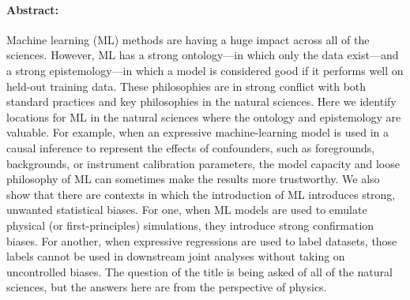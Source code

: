 \documentclass[10pt]{article}
\renewenvironment{abstract}{\paragraph{Abstract:}}{}
\begin{document}

\begin{abstract}
  Machine learning (ML) methods are having a huge impact across all of the sciences.
  However, ML has a strong ontology---in which only the data exist---and a strong epistemology---in which a model is considered good if it performs well on held-out training data.
  These philosophies are in strong conflict with both standard practices and key philosophies in the natural sciences.
  Here we identify locations for ML in the natural sciences where the ontology and epistemology are valuable.
  For example, when an expressive machine-learning model is used in a causal inference to represent the effects of confounders, such as foregrounds, backgrounds, or instrument calibration parameters, the model capacity and loose philosophy of ML can sometimes make the results more trustworthy.
  We also show that there are contexts in which the introduction of ML introduces strong, unwanted statistical biases.
  For one, when ML models are used to emulate physical (or first-principles) simulations, they introduce strong confirmation biases.
  For another, when expressive regressions are used to label datasets, those labels cannot be used in downstream joint analyses without taking on uncontrolled biases.
  The question of the title is being asked of all of the natural sciences, but the answers here are from the perspective of physics.
\end{abstract}
\end{document}
